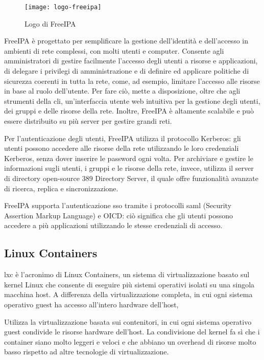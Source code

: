 \begin{figure}[!h] 
    \centering 
    \texttt{[image: logo-freeipa]} 
    \caption{Logo di FreeIPA}
    \label{fig:logo-freeipa}
\end{figure}


FreeIPA è progettato per semplificare la gestione dell'identità e dell'accesso in ambienti di rete complessi, con molti utenti e computer. Consente agli amministratori di gestire facilmente l'accesso degli utenti a risorse e applicazioni, di delegare i privilegi di amministrazione e di definire ed applicare politiche di sicurezza coerenti in tutta la rete, come, ad esempio, limitare l'accesso alle risorse in base al ruolo dell'utente. Per fare ciò, mette a disposizione, oltre che agli strumenti della \acrshort{cli}, un'interfaccia utente web intuitiva per la gestione degli utenti, dei gruppi e delle risorse della rete. Inoltre, FreeIPA è altamente scalabile e può essere distribuito su più server per gestire grandi reti.

Per l'autenticazione degli utenti, FreeIPA utilizza il protocollo Kerberos: gli utenti possono accedere alle risorse della rete utilizzando le loro credenziali Kerberos, senza dover inserire le password ogni volta.
Per archiviare e gestire le informazioni sugli utenti, i gruppi e le risorse della rete, invece, utilizza il server di directory open-source 389 Directory Server, il quale offre funzionalità avanzate di ricerca, replica e sincronizzazione.

FreeIPA supporta l'autenticazione \acrshort{sso} tramite i protocolli \acrfull{saml} (Security Assertion Markup Language) e OICD: ciò significa che gli utenti possono accedere a più applicazioni utilizzando le stesse credenziali di accesso.

\subsection{Linux Containers}
\acrfull{lxc} è l'acronimo di Linux Containers, un sistema di virtualizzazione basato sul kernel Linux che consente di eseguire più sistemi operativi isolati su una singola macchina host. A differenza della virtualizzazione completa, in cui ogni sistema operativo guest ha accesso all'intero hardware dell'host, 

Utilizza la virtualizzazione basata sui contenitori, in cui ogni sistema operativo guest condivide le risorse hardware dell'host.
La condivisione del kernel fa sì che i container siano molto leggeri e veloci e che abbiano un overhead di risorse molto basso rispetto ad altre tecnologie di virtualizzazione.

